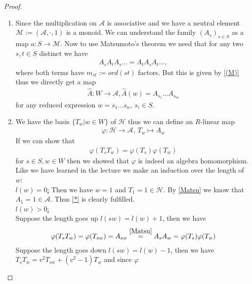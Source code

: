 \documentclass[]{article}
\begin{document}
\begin{proof}
    \begin{enumerate}
        \item Since the multiplication on \(\mathscr{A}\) is associative and we have a neutral element \(\mathcal{M}:=(\mathscr{A},\cdot, 1)\) is a monoid.
        We can understand the family \((A_s)_{s \in S}\) as a map \(a: S \rightarrow \mathcal{M}\). Now to use Matsumoto's theorem
        we need that for any two \(s,t \in S\) distinct we have
        \begin{align*}
            A_s A_t A_s \dots = A_t A_s A_t \dots , 
        \end{align*}
        where both terms have \(m_{st}:=ord(st)\) factors. But this is given by \ref{(M)} thus we directly get a map
        \begin{align}
            \hat{A}: W \rightarrow \mathscr{A}, \hat{A}(w)=A_{s_1}\dots A_{s_m} 
            \label{Matsu}
        \end{align}
        for any reduced expression \(w = s_1 \dots s_n, \ s_i \in S\). 
        \item We have the basis \(\{T_w | w \in W\}\) of \(\mathscr{H}\) thus we can define an \(R\)-linear map
        \begin{align*}
            \varphi : \mathscr{H} \rightarrow \mathscr{A}, \ T_w \mapsto A_w
        \end{align*}
        If we can show that
        \begin{align*}
            \varphi(T_s T_w)=\varphi(T_s)\varphi(T_w) \tag{\(*\)}
            \label{*}
        \end{align*}
        for \(s \in S, w \in W\) then we showed that \(\varphi\) is indeed an algebra homomorphism. 
        Like we have learned in the lecture we make an induction over the length of \(w\): \\
        \underline{\(l(w)=0\):} Then we have \(w=1\) and \(T_1 = 1 \in \mathscr{H}\). By \eqref{Matsu} we know that \(A_1 = 1 \in \mathscr{A}\). 
        Thus \eqref{*} is clearly fulfilled. \\
        \underline{\(l(w)>0\):} \\
        Suppose the length goes up \(l(sw)=l(w)+1\), then we have
        \begin{align*}
            \varphi(T_s T_w) = \varphi(T_{sw})= A_{sw} \overset{\eqref{Matsu}}{=} A_s A_w = \varphi(T_s) \varphi(T_w)
        \end{align*}
        Suppose the length goes down \(l(sw)=l(w)-1\), then we have \(T_s T_w = v^2 T_{sw} + (v^2 -1) T_w\) and since \(\varphi\)

\end{enumerate}
\end{proof}
\end{document}
